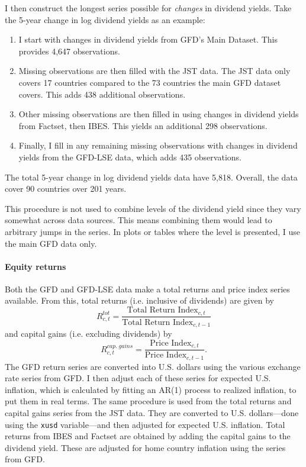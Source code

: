 I then construct the longest series possible for \textit{changes} in dividend yields. Take the 5-year change in log dividend yields as an example:
\begin{enumerate}
	\item I start with changes in dividend yields from GFD's Main Dataset.  This provides 4,647 observations. 
	\item Missing observations are then filled with the JST data. The JST data only covers 17 countries compared to the 73 countries the main GFD dataset covers.  This adds 438 additional observations. 
	\item Other missing observations are then filled in using changes in dividend yields from Factset, then IBES. This yields an additional 298 observations. 
	\item  Finally, I fill in any remaining missing observations with changes in dividend yields from the GFD-LSE data, which adds 435 observations. 
\end{enumerate}
The total 5-year change in log dividend yields data have 5,818. Overall, the data cover 90 countries over 201 years.

This procedure is not used to combine levels of the dividend yield since they vary somewhat across data sources. This means combining them would lead to arbitrary jumps in the series. In plots or tables where the level is presented, I use the main GFD data only.

\paragraph{Equity returns}
Both the GFD and GFD-LSE data make a total returns and price index series available. From this, total returns (i.e. inclusive of dividends) are given by
\begin{equation*}
R^{tot}_{c,t} = \frac{\text{Total Return Index}_{c,t}}{\text{Total Return Index}_{c,t-1}}
\end{equation*}
and capital gains (i.e. excluding dividends) by
\begin{equation*}
R^{cap. \; gains}_{c,t} = \frac{\text{Price Index}_{c,t}}{\text{Price Index}_{c,t-1}}.
\end{equation*}
The GFD return series are converted into U.S. dollars using the various exchange rate series from GFD. I then adjust each of these series for expected U.S. inflation, which is calculated by fitting an AR(1) process to realized inflation, to put them in real terms. The same procedure is used from the total returns and capital gains series from the JST data. They are converted to U.S. dollars---done using the \texttt{xusd} variable---and then adjusted for expected U.S. inflation. Total returns from IBES and Factset are obtained by adding the capital gains to the dividend yield. These are adjusted for home country inflation using the series from GFD.
\label{par:convert_dollars_eq}


